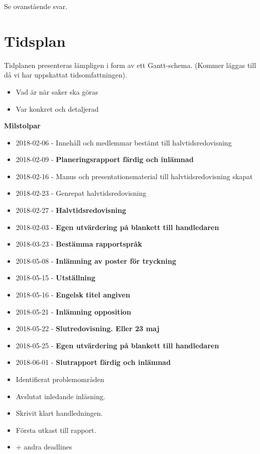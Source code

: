 \documentclass[12pt,a4paper]{article}
\begin{document}
Se ovanstående svar.

\section{Tidsplan}

Tidplanen presenteras lämpligen i form av ett Gantt-schema.
(Kommer läggas till då vi har uppskattat tidsomfattningen).

\begin{itemize}
    \item Vad är när saker ska göras
    \item Var konkret och detaljerad
\end{itemize}

\textbf{Milstolpar}

\begin{itemize}
    \item 2018-02-06 - Innehåll och medlemmar bestämt till halvtidsredovisning
    \item 2018-02-09 - \textbf{Planeringsrapport färdig och inlämnad}
    \item 2018-02-16 - Manus och presentationsmaterial till halvtidsredovisning skapat
    \item 2018-02-23 - Genrepat halvtidsredovisning
    \item 2018-02-27 - \textbf{Halvtidsredovisning}
    \item 2018-02-03 - \textbf{Egen utvärdering på blankett till handledaren}
    \item 2018-03-23 - \textbf{Bestämma rapportspråk}
    \item 2018-05-08 - \textbf{Inlämning av poster för tryckning}
    \item 2018-05-15 - \textbf{Utställning}
    \item 2018-05-16 - \textbf{Engelsk titel angiven}
    \item 2018-05-21 - \textbf{Inlämning opposition}
    \item 2018-05-22 - \textbf{Slutredovisning. Eller 23 maj}
    \item 2018-05-25 - \textbf{Egen utvärdering på blankett till handledaren}
    \item 2018-06-01 - \textbf{Slutrapport färdig och inlämnad}
    \item Identifierat problemområden
    \item Avslutat inledande inläsning.
    \item Skrivit klart handledningen.
    \item Första utkast till rapport.
    \item + andra deadlines
\end{itemize}
\end{document}
